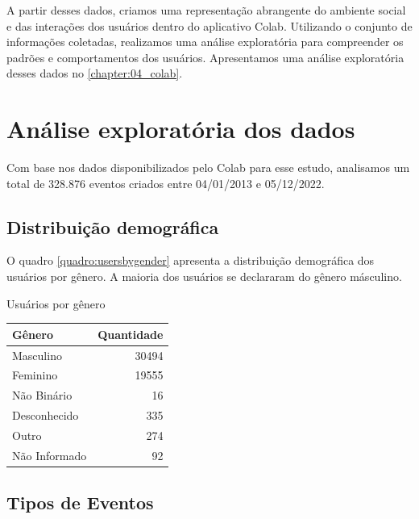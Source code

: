 A partir desses dados, criamos uma representação abrangente do ambiente social e das interações dos usuários dentro do aplicativo Colab. Utilizando o conjunto de informações coletadas, realizamos uma análise exploratória para compreender os padrões e comportamentos dos usuários. Apresentamos uma análise exploratória desses dados no \autoref{chapter:04_colab}.

\section{Análise exploratória dos dados}
\label{sec:colab_data_analysis}

Com base nos dados disponibilizados pelo Colab para esse estudo, analisamos um total de 328.876 eventos criados entre 04/01/2013 e 05/12/2022.

\subsection*{Distribuição demográfica}

O quadro \autoref{quadro:usersbygender} apresenta a distribuição demográfica dos usuários por gênero. A maioria dos usuários se declararam do gênero másculino.

\begin{quadro}[htb]
	\caption{Usuários por gênero}
	\label{quadro:usersbygender}
	\centering
	\begin{tabular}{|l|r|}
		\hline
		\textbf{Gênero} & \textbf{Quantidade} \\
		\hline
		Masculino       & 30494               \\
		Feminino        & 19555               \\
		Não Binário     & 16                  \\
		Desconhecido    & 335                 \\
		Outro           & 274                 \\
		Não Informado   & 92                  \\
		\hline
	\end{tabular}
\end{quadro}

\subsection*{Tipos de Eventos}

